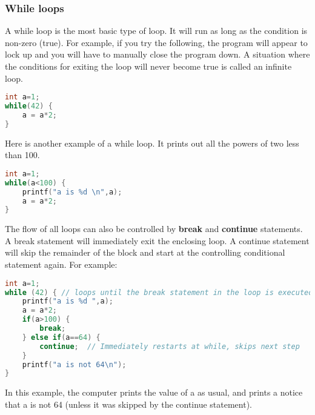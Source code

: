 \subsubsection{While loops}
A while loop is the most basic type of loop. It will run as long as the
condition is non-zero (true). For example, if you try the following, the
program will appear to lock up and you will have to manually close the program
down. A situation where the conditions for exiting the loop will never become
true is called an infinite loop. 
\lstset{basicstyle=\scriptsize, numbers=left, captionpos=b, tabsize=4}
\begin{lstlisting}[caption=Section \thesection listing \arabic{controlcnt},language={C},
breaklines=true,xleftmargin=15pt, label=lst:section\thesection listing\arabic{controlcnt}]
int a=1;
while(42) {
	a = a*2;
}
\end{lstlisting}

Here is another example of a while loop. It prints out all the powers of two
less than 100.
\lstset{basicstyle=\scriptsize, numbers=left, captionpos=b, tabsize=4}
\begin{lstlisting}[caption=Section \thesection listing \arabic{controlcnt},language={C},
breaklines=true,xleftmargin=15pt, label=lst:section\thesection listing\arabic{controlcnt}]
int a=1;
while(a<100) {
	printf("a is %d \n",a);
	a = a*2;
}
\end{lstlisting}

The flow of all loops can also be controlled by \textbf{break} and
\textbf{continue} statements. A break statement will immediately exit the
enclosing loop. A continue statement will skip the remainder of the block and
start at the controlling conditional statement again. For example:
\lstset{basicstyle=\scriptsize, numbers=left, captionpos=b, tabsize=4}
\begin{lstlisting}[caption=Section \thesection listing \arabic{controlcnt},language={C},
breaklines=true,xleftmargin=15pt, label=lst:section\thesection listing\arabic{controlcnt}]
int a=1;
while (42) { // loops until the break statement in the loop is executed
	printf("a is %d ",a);
	a = a*2;
	if(a>100) {
		break;
	} else if(a==64) {
		continue;  // Immediately restarts at while, skips next step
	}
	printf("a is not 64\n");
}
\end{lstlisting}

In this example, the computer prints the value of a as usual, and prints a
notice that a is not 64 (unless it was skipped by the continue statement).

